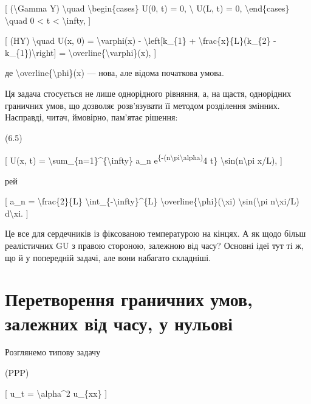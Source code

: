\documentclass[
]{article}
\begin{document}
{[} (\textbackslash Gamma Y) \textbackslash quad
\textbackslash begin\{cases\} U(0, t) = 0, \textbackslash{} U(L, t) = 0,
\textbackslash end\{cases\} \textbackslash quad 0 \textless{} t
\textless{} \textbackslash infty, {]}

{[} (HY) \textbackslash quad U(x, 0) = \textbackslash varphi(x) -
\textbackslash left{[}k\_\{1\} + \textbackslash frac\{x\}\{L\}(k\_\{2\}
- k\_\{1\})\textbackslash right{]} =
\textbackslash overline\{\textbackslash varphi\}(x), {]}

де \textbackslash overline\{\textbackslash phi\}(x) --- нова, але відома
початкова умова.

Ця задача стосується не лише однорідного рівняння, а, на щастя,
однорідних граничних умов, що дозволяє розв'язувати її методом
розділення змінних. Насправді, читач, ймовірно, пам'ятає рішення:

(6.5)

{[} U(x, t) = \textbackslash sum\_\{n=1\}\^{}\{\textbackslash infty\}
a\_n e\textsuperscript{\{-(n\textbackslash pi\textbackslash alpha)}4 t\}
\textbackslash sin(n\textbackslash pi x/L), {]}

рей

{[} a\_n = \textbackslash frac\{2\}\{L\}
\textbackslash int\_\{-\textbackslash infty\}\^{}\{L\}
\textbackslash overline\{\textbackslash phi\}(\textbackslash xi)
\textbackslash sin(\textbackslash pi n\textbackslash xi/L)
d\textbackslash xi. {]}

Це все для сердечників із фіксованою температурою на кінцях. А як щодо
більш реалістичних GU з правою стороною, залежною від часу? Основні ідеї
тут ті ж, що й у попередній задачі, але вони набагато складніші.

\section{Перетворення граничних умов, залежних від часу, у
нульові}\label{ux43fux435ux440ux435ux442ux432ux43eux440ux435ux43dux43dux44f-ux433ux440ux430ux43dux438ux447ux43dux438ux445-ux443ux43cux43eux432-ux437ux430ux43bux435ux436ux43dux438ux445-ux432ux456ux434-ux447ux430ux441ux443-ux443-ux43dux443ux43bux44cux43eux432ux456}

Розглянемо типову задачу

(PPP)

{[} u\_t = \textbackslash alpha\^{}2 u\_\{xx\} {]}
\end{document}

